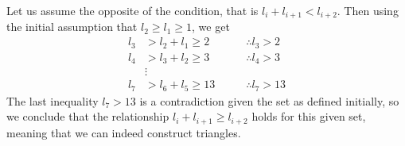 \documentclass[12pt]{article}
\begin{document}
		\noindent Let us assume the opposite of the condition, that is $l_i + l_{i+1} < l_{i+2}$. Then using the initial assumption that $l_2 \ge l_1 \ge 1$, we get 
		\begin{align*}
			l_3 &> l_2 + l_1 \ge 2 \qquad & \therefore l_3 > 2\\
			l_4 &> l_3 + l_2 \ge 3 \qquad & \therefore l_4 > 3 \\
			& \vdots & \\
			l_7 &> l_6 + l_5 \ge 13 \qquad & \therefore l_7 > 13
		\end{align*}
		The last inequality $l_7 > 13$ is a contradiction given the set as defined initially, so we conclude that the relationship $l_i + l_{i+1} \ge l_{i+2}$ holds for this given set, meaning that we can indeed construct triangles. 
\end{document}
